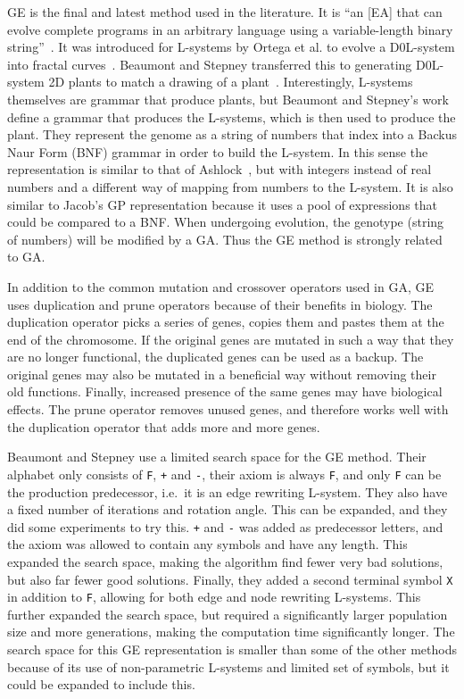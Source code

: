 \gls{GE} is the final and latest method used in the literature.
It is ``an [\gls{EA}] that can evolve complete programs in an arbitrary language using a variable-length binary string''~\cite{2003Oneil}.
It was introduced for \glspl{L-system} by Ortega et al. to evolve a D0L-system into fractal curves~\cite{2003Ortega}.
Beaumont and Stepney transferred this to generating D0L-system 2D plants to match a drawing of a plant~\cite{2009Beaumont}.
Interestingly, \glspl{L-system} themselves are grammar that produce plants, but Beaumont and Stepney's work define a grammar that produces the \glspl{L-system}, which is then used to produce the plant.
They represent the genome as a string of numbers that index into a Backus Naur Form (BNF) grammar in order to build the \gls{L-system}.
In this sense the representation is similar to that of Ashlock~\cite{2006Ashlock}, but with integers instead of real numbers and a different way of mapping from numbers to the \gls{L-system}.
It is also similar to Jacob's \gls{GP} representation because it uses a pool of expressions that could be compared to a BNF.
When undergoing evolution, the genotype (string of numbers) will be modified by a \gls{GA}.
Thus the \gls{GE} method is strongly related to \gls{GA}.

In addition to the common mutation and crossover operators used in \gls{GA}, \gls{GE} uses duplication and prune operators because of their benefits in biology.
The duplication operator picks a series of genes, copies them and pastes them at the end of the chromosome.
If the original genes are mutated in such a way that they are no longer functional, the duplicated genes can be used as a backup.
The original genes may also be mutated in a beneficial way without removing their old functions.
Finally, increased presence of the same genes may have biological effects.
The prune operator removes unused genes, and therefore works well with the duplication operator that adds more and more genes.~\cite{1998Ryan}

Beaumont and Stepney use a limited search space for the \gls{GE} method.
Their alphabet only consists of \texttt{F}, \texttt{+} and \texttt{-}, their axiom is always \texttt{F}, and only \texttt{F} can be the production predecessor, i.e.\ it is an edge rewriting \gls{L-system}.
They also have a fixed number of iterations and rotation angle.
This can be expanded, and they did some experiments to try this.
\texttt{+} and \texttt{-} was added as predecessor letters, and the axiom was allowed to contain any symbols and have any length.
This expanded the search space, making the algorithm find fewer very bad solutions, but also far fewer good solutions.
Finally, they added a second terminal symbol \texttt{X} in addition to \texttt{F}, allowing for both edge and node rewriting \glspl{L-system}.
This further expanded the search space, but required a significantly larger population size and more generations, making the computation time significantly longer.
The search space for this \gls{GE} representation is smaller than some of the other methods because of its use of non-parametric \glspl{L-system} and limited set of symbols, but it could be expanded to include this.

